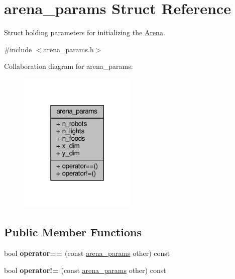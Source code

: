 \hypertarget{structarena__params}{}\section{arena\+\_\+params Struct Reference}
\label{structarena__params}


Struct holding parameters for initializing the \hyperlink{classArena}{Arena}.  




{\ttfamily \#include $<$arena\+\_\+params.\+h$>$}



Collaboration diagram for arena\+\_\+params\+:\nopagebreak
\begin{figure}[H]
\begin{center}
\leavevmode
\includegraphics[width=159pt]{structarena__params__coll__graph}
\end{center}
\end{figure}
\subsection*{Public Member Functions}
\begin{DoxyCompactItemize}
\item 
bool {\bfseries operator==} (const \hyperlink{structarena__params}{arena\+\_\+params} other) const \hypertarget{structarena__params_ac798e515c2e8dda419e54aee5171e374}{}\label{structarena__params_ac798e515c2e8dda419e54aee5171e374}

\item 
bool {\bfseries operator!=} (const \hyperlink{structarena__params}{arena\+\_\+params} other) const \hypertarget{structarena__params_a02fe0befdee5fb891b19948371983852}{}\label{structarena__params_a02fe0befdee5fb891b19948371983852}

\end{DoxyCompactItemize}
